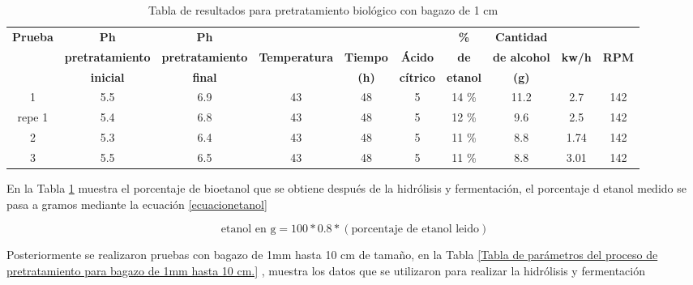 \documentclass[12pt]{article}
\begin{document}
 	\begin{table}[H]
 		\centering
 		\caption{Tabla de resultados para pretratamiento biológico con bagazo de 1 cm}
 		\label{tabla biologico 2}
 		\resizebox{16cm}{!} {
 			\begin{tabular}{|c|c|c|c|c|c|c|c|c|c|}
 				\hline
 				\textbf{Prueba}	& \textbf{Ph}& \textbf{Ph} &  &  &  &\textbf{\%} & \textbf{Cantidad} & &\\
 				&	\textbf{pretratamiento} & 	\textbf{pretratamiento} & \textbf{Temperatura} & \textbf{Tiempo} & \textbf{Ácido} & \textbf{de } & \textbf{de alcohol } & \textbf{kw/h}& \textbf{RPM}\\
 								&	\textbf{inicial}& \textbf{final} &  &\textbf{(h)}  & \textbf{cítrico} & \textbf{etanol }& \textbf{(g) }&& \\ \hline		
 				1	&5.5& 6.9 & 43& 48 & 5 & 14 \% &11.2 & 2.7& 142 \\ \hline
 			repe 1	&5.4& 6.8& 43& 48 & 5 & 12 \% &9.6 & 2.5 & 142 \\ \hline
 				2	&5.3& 6.4& 43 & 48 & 5 & 11 \%  &8.8 & 1.74& 142 \\ \hline
 				3	&5.5& 6.5 & 43& 48 & 5 & 11 \%  &8.8& 3.01&142 \\ \hline
 		\end{tabular} }
 		
 	\end{table}
 	
 	En la Tabla \ref{tabla biologico 2} muestra el porcentaje de bioetanol que se obtiene después de la hidrólisis y fermentación, el porcentaje d etanol medido se pasa a gramos mediante la ecuación \ref{ecuacionetanol}
 	
 	\begin{equation}
 		\label{ecuacionetanol}
 		\text{etanol en g}= 100* 0.8 *( \text{porcentaje de etanol leido})
 	\end{equation}
 	
 	Posteriormente se realizaron pruebas con bagazo de 1mm hasta 10 cm de tamaño, en la Tabla 	\ref{Tabla de parámetros del proceso de pretratamiento para bagazo de 1mm hasta 10 cm.} , muestra los datos que se utilizaron para realizar la hidrólisis y fermentación 
 	
\end{document}
